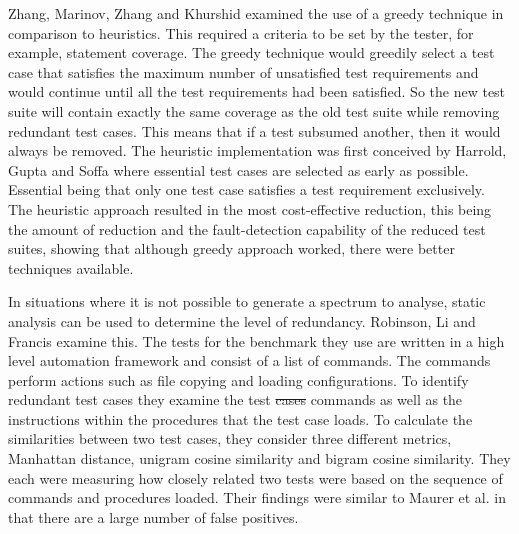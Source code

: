 \documentclass[11pt
              , a4paper
              , twoside
              , openright
              ]{report}
\providecommand{\DIFadd}[1]{{\protect\color{blue}\uwave{#1}}} %
\providecommand{\DIFdel}[1]{{\protect\color{red}\sout{#1}}}                      %
\providecommand{\DIFaddbegin}{} %
\providecommand{\DIFaddend}{} %
\providecommand{\DIFdelbegin}{} %
\providecommand{\DIFdelend}{} %
\begin{document}
Zhang, Marinov, Zhang and Khurshid \cite{zhang2011empirical} examined the use of a greedy technique in comparison to heuristics. This required a criteria to be set by the tester, for example, statement coverage. The greedy technique would greedily select a test case that satisfies the maximum number of unsatisfied test requirements and would continue until all the test requirements had been satisfied. So the new test suite will contain exactly the same coverage as the old test suite while removing redundant test cases. This means that if a test subsumed another, then it would always be removed. The heuristic implementation was first conceived by Harrold, Gupta and Soffa \cite{harrold1993methodology} where essential test cases are selected as early as possible. Essential being that only one test case satisfies a test requirement exclusively. The heuristic approach resulted in the most cost-effective reduction, this being the amount of reduction and the fault-detection capability of the reduced test suites, showing that although greedy approach worked, there were better techniques available.

In situations where it is not possible to generate a spectrum to analyse, static analysis can be used to determine the level of redundancy. Robinson, Li and Francis \cite{li2008static} examine this. The tests for the benchmark they use are written in a high level automation framework and consist of a list of commands. The commands perform actions such as file copying and loading configurations. To identify redundant test cases they examine the test \DIFdelbegin \DIFdel{cases }\DIFdelend \DIFaddbegin \DIFadd{case }\DIFaddend commands as well as the instructions within the procedures that the test case loads. To calculate the similarities between two test cases, they consider three different metrics, Manhattan distance, unigram cosine similarity and bigram cosine similarity. They each were measuring how closely related two tests were based on the sequence of commands and procedures loaded. Their findings were similar to Maurer et al. \cite{koochakzadeh2009test} in that there are a large number of false positives. \DIFdelbegin %
\end{document}
